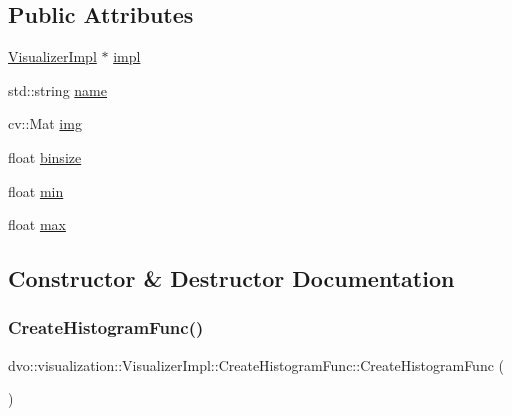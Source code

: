 \subsection*{Public Attributes}
\begin{DoxyCompactItemize}
\item 
\mbox{\hyperlink{classdvo_1_1visualization_1_1_visualizer_impl}{Visualizer\+Impl}} $\ast$ \mbox{\hyperlink{structdvo_1_1visualization_1_1_visualizer_impl_1_1_create_histogram_func_ae19bb1f928d400acb2e3fc28abfcbc1f}{impl}}
\item 
std\+::string \mbox{\hyperlink{structdvo_1_1visualization_1_1_visualizer_impl_1_1_create_histogram_func_a638ab4faaac71fc668bc6fb5e5c507b1}{name}}
\item 
cv\+::\+Mat \mbox{\hyperlink{structdvo_1_1visualization_1_1_visualizer_impl_1_1_create_histogram_func_a7952450e28b9783d240be3c97e5fcbcf}{img}}
\item 
float \mbox{\hyperlink{structdvo_1_1visualization_1_1_visualizer_impl_1_1_create_histogram_func_a717312061e68d056ae466ff779fdbb4d}{binsize}}
\item 
float \mbox{\hyperlink{structdvo_1_1visualization_1_1_visualizer_impl_1_1_create_histogram_func_a8e2240d16aa20296dd4972aec744d3c4}{min}}
\item 
float \mbox{\hyperlink{structdvo_1_1visualization_1_1_visualizer_impl_1_1_create_histogram_func_a3065555b8878be3836e64f3b72bc2d01}{max}}
\end{DoxyCompactItemize}


\subsection{Constructor \& Destructor Documentation}
\mbox{\label{structdvo_1_1visualization_1_1_visualizer_impl_1_1_create_histogram_func_a46119b239b3abe5149e87476909c9261}} 
\subsubsection{\texorpdfstring{Create\+Histogram\+Func()}{CreateHistogramFunc()}\hspace{0.1cm}{\footnotesize\ttfamily [1/3]}}
{\footnotesize\ttfamily dvo\+::visualization\+::\+Visualizer\+Impl\+::\+Create\+Histogram\+Func\+::\+Create\+Histogram\+Func (\begin{DoxyParamCaption}{ }\end{DoxyParamCaption})\hspace{0.3cm}{\ttfamily [inline]}}

